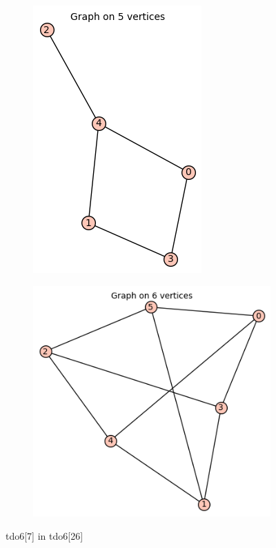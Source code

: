 \documentclass[12pt, a4paper]{article}
\begin{document}
\begin{center}
\begin{figure}[!htb]
\centering
\begin{subfigure}{0.5\textwidth}
  \centering
  \includegraphics[width=0.5\linewidth]{tdo6[7]}
\end{subfigure}%
\begin{subfigure}{0.5\textwidth}
  \centering
  \includegraphics[width=0.5\linewidth]{tdo6[26]}
\end{subfigure}
\caption{tdo6[7] in tdo6[26]}
\label{fig:test}
\end{figure}


\end{center}
\end{document}
